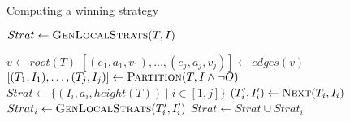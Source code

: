 
%
\begin{algorithm}[t]
   \caption{Computing a winning strategy}\label{alg:strat}
   \begin{algorithmic}[1]
            \State $Strat \gets \Call{GenLocalStrats}{T,I}$
            \State {}
        \EndFunction
        \Statex

            \State $v \gets root(T)$
            \State $[(e_1, a_1, v_1),\ldots,(e_j,a_j,v_j)] \gets edges(v)$
            \State $[(T_1,I_1),\ldots,(T_j, I_j)] \gets \textsc{Partition}(T, I \land \neg O)$
            \State $Strat \gets \{(I_i, a_i, height(T)) \mid i \in[1,j]\}$\label{alg:strat:strati}
            \label{alg:strat:for}
                \State $(T_i', I_i') \gets \textsc{Next}(T_i, I_i)$\label{alg:strat:next}
                \State $Strat_i \gets \Call{GenLocalStrats}{T_i', I_i'}$\label{alg:strat:rec}
                \State $Strat \gets Strat \cup Strat_i$
            \EndFor\label{alg:strat:endfor}
            \State {} \label{alg:strat:return}
        \EndFunction
    \end{algorithmic}
\end{algorithm}

